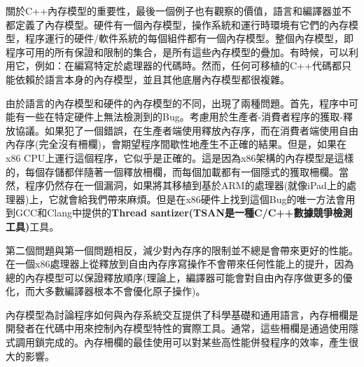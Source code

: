關於C++內存模型的重要性，最後一個例子也有觀察的價值，語言和編譯器並不都定義了內存模型。硬件有一個內存模型，操作系統和運行時環境有它們的內存模型，程序運行的硬件/軟件系統的每個組件都有一個內存模型。整個內存模型，即程序可用的所有保證和限制的集合，是所有這些內存模型的疊加。有時候，可以利用它，例如：在編寫特定於處理器的代碼時。然而，任何可移植的C++代碼都只能依賴於語言本身的內存模型，並且其他底層內存模型都很複雜。

由於語言的內存模型和硬件的內存模型的不同，出現了兩種問題。首先，程序中可能有一些在特定硬件上無法檢測到的Bug。考慮用於生產者-消費者程序的獲取-釋放協議。如果犯了一個錯誤，在生產者端使用釋放內存序，而在消費者端使用自由內存序(完全沒有柵欄)，會期望程序間歇性地產生不正確的結果。但是，如果在x86 CPU上運行這個程序，它似乎是正確的。這是因為x86架構的內存模型是這樣的，每個存儲都伴隨著一個釋放柵欄，而每個加載都有一個隱式的獲取柵欄。當然，程序仍然存在一個漏洞，如果將其移植到基於ARM的處理器(就像iPad上的處理器)上，它就會給我們帶來麻煩。但是在x86硬件上找到這個Bug的唯一方法會用到GCC和Clang中提供的\textbf{Thread santizer(TSAN是一種C/C++數據競爭檢測工具)}工具。

第二個問題與第一個問題相反，減少對內存序的限制並不總是會帶來更好的性能。在一個x86處理器上從釋放到自由內存序寫操作不會帶來任何性能上的提升，因為總的內存模型可以保證釋放順序(理論上，編譯器可能會對自由內存序做更多的優化，而大多數編譯器根本不會優化原子操作)。

內存模型為討論程序如何與內存系統交互提供了科學基礎和通用語言，內存柵欄是開發者在代碼中用來控制內存模型特性的實際工具。通常，這些柵欄是通過使用隱式調用鎖完成的。內存柵欄的最佳使用可以對某些高性能併發程序的效率，產生很大的影響。














